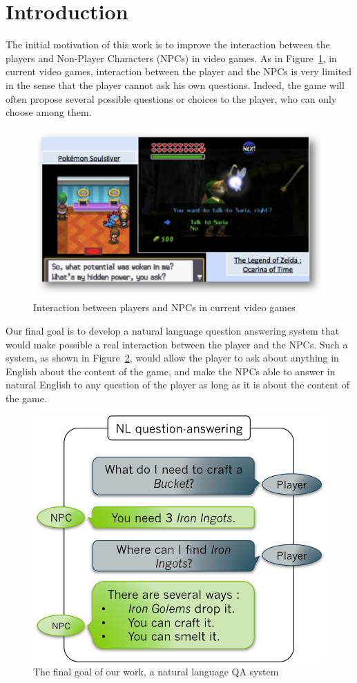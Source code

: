 \documentclass[12pt]{article}
\begin{document}
\section{Introduction}
The initial motivation of this work is to improve the interaction between the players and Non-Player Characters (NPCs) in video games.
As in Figure~\ref{currentInteraction}, in current video games, interaction between the player and the NPCs is very limited in the sense that the player cannot ask his own questions.
Indeed, the game will often propose several possible questions or choices to the player, who can only choose among them.\\
\begin{figure}[!ht]
	\centering \includegraphics[width=0.9\linewidth]{Figures/Intro_Conclusion/currentInteraction.png}
	\caption{\label{currentInteraction}Interaction between players and NPCs in current video games}
\end{figure}
Our final goal is to develop a natural language question answering system that would make possible a real interaction between the player and the NPCs.
Such a system, as shown in Figure~\ref{goal}, would allow the player to ask about anything in English about the content of the game, and make the NPCs able to answer in natural English to any question of the player as long as it is about the content of the game.\\
\begin{figure}[!ht]
	\centering \includegraphics[width=0.7\linewidth]{Figures/Intro_Conclusion/goal.png}
	\caption{\label{goal}The final goal of our work, a natural language QA system}
\end{figure}
\end{document}
